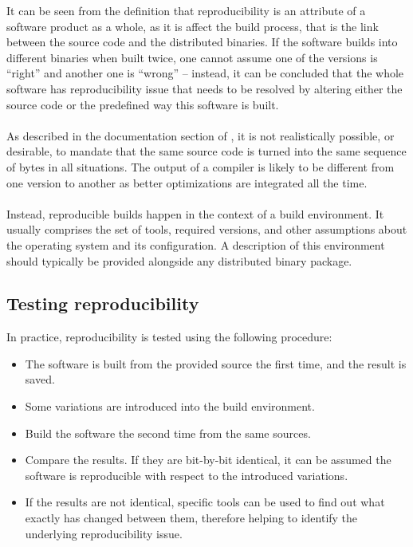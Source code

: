 {It can be seen from the definition that reproducibility is an attribute of a software product as a whole, as it is affect the build process, that is the link between the source code and the distributed binaries. If the software builds into different binaries when built twice, one cannot assume one of the versions is ``right'' and another one is ``wrong'' -- instead, it can be concluded that the whole software has reproducibility issue that needs to be resolved by altering either the source code or the predefined way this software is built.\\\\

As described in the documentation section of \autocite{rb}, it is not realistically possible, or desirable, to mandate that the same source code is turned into the same sequence of bytes in all situations. The output of a compiler is likely to be different from one version to another as better optimizations are integrated all the time.\\\\
Instead, reproducible builds happen in the context of a build environment. It usually comprises the set of tools, required versions, and other assumptions about the operating system and its configuration. A description of this environment should typically be provided alongside any distributed binary package.
}
\subsection[Testing reproducibility]{Testing reproducibility}
In practice, reproducibility is tested using the following procedure:
\begin{itemize}
    \item The software is built from the provided source the first time, and the result is saved.
    \item Some variations are introduced into the build environment.
    \item Build the software the second time from the same sources.
    \item Compare the results. If they are bit-by-bit identical, it can be assumed the software is reproducible with respect to the introduced variations.
    \item If the results are not identical, specific tools can be used to find out what exactly has changed between them, therefore helping to identify the underlying reproducibility issue.
\end{itemize}

